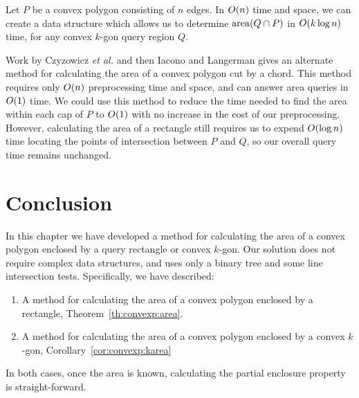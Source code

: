 \begin{corollary}
\label{cor:convexp:karea}
Let $P$ be a convex polygon consisting of $n$ edges. In $O\!\left(n\right)$ time and space, we can create a data structure which allows us to determine $\operatorname{area}\!\left(Q \cap P\right)$ in $O\!\left(k \log{n}\right)$ time, for any convex $k$-gon query region $Q$.
\end{corollary}

Work by Czyzowicz \textit{et al.}\cite{DBLP:conf/cccg/CzyzowiczCU98} and then Iacono and Langerman\cite{IaconoL00} gives an alternate method for calculating the area of a convex polygon cut by a chord.
This method requires only $O\!\left(n\right)$ preprocessing time and space, and can answer area queries in $O\!\left(1\right)$ time.
We could use this method to reduce the time needed to find the area within each cap of $P$ to $O\!\left(1\right)$ with no increase in the cost of our preprocessing.
However, calculating the area of a rectangle still requires us to expend $O\!\left(\log{n}\right)$ time locating the points of intersection between $P$ and $Q$, so our overall query time remains unchanged.


\section{Conclusion}
\label{:convexp:concl}

In this chapter we have developed a method for calculating the area of a convex polygon enclosed by a query rectangle or convex $k$-gon. 
Our solution does not require complex data structures, and uses only a binary tree and some line intersection tests.
Specifically, we have described:

\begin{enumerate}
\item A method for calculating the area of a convex polygon enclosed by a rectangle, Theorem~\ref{th:convexp:area}.

\item A method for calculating the area of a convex polygon enclosed by a convex $k$-gon, Corollary~\ref{cor:convexp:karea}
\end{enumerate}

In both cases, once the area is known, calculating the partial enclosure property is straight-forward.
